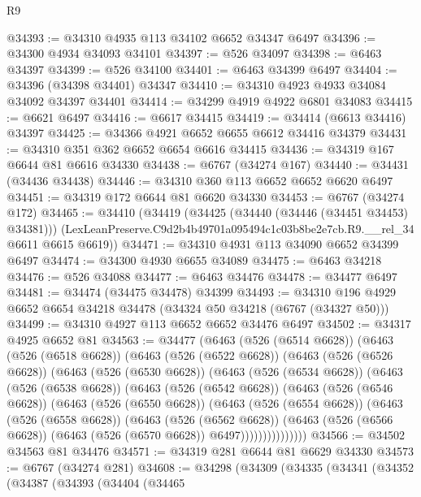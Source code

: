 \begin{lexlean}{R9}
\begin{coremodule}
@34393 := @34310 @4935 @113 @34102 @6652 @34347 @6497
@34396 := @34300 @4934 @34093 @34101
@34397 := @526 @34097
@34398 := @6463 @34397
@34399 := @526 @34100
@34401 := @6463 @34399 @6497
@34404 := @34396 (@34398 @34401) @34347
@34410 := @34310 @4923 @4933 @34084 @34092 @34397 @34401
@34414 := @34299 @4919 @4922 @6801 @34083
@34415 := @6621 @6497
@34416 := @6617 @34415
@34419 := @34414 (@6613 @34416) @34397
@34425 := @34366 @4921 @6652 @6655 @6612 @34416 @34379
@34431 := @34310 @351 @362 @6652 @6654 @6616 @34415
@34436 := @34319 @167 @6644 @81 @6616 @34330
@34438 := @6767 (@34274 @167)
@34440 := @34431 (@34436 @34438)
@34446 := @34310 @360 @113 @6652 @6652 @6620 @6497
@34451 := @34319 @172 @6644 @81 @6620 @34330
@34453 := @6767 (@34274 @172)
@34465 := @34410
    (@34419
      (@34425 (@34440 (@34446 (@34451 @34453) @34381)))
      (LexLeanPreserve.C9d2b4b49701a095494c1c03b8be2e7cb.R9.__rel_34 @6611 @6615 @6619))
@34471 := @34310 @4931 @113 @34090 @6652 @34399 @6497
@34474 := @34300 @4930 @6655 @34089
@34475 := @6463 @34218
@34476 := @526 @34088
@34477 := @6463 @34476
@34478 := @34477 @6497
@34481 := @34474 (@34475 @34478) @34399
@34493 := @34310 @196 @4929 @6652 @6654 @34218 @34478 (@34324 @50 @34218 (@6767 (@34327 @50)))
@34499 := @34310 @4927 @113 @6652 @6652 @34476 @6497
@34502 := @34317 @4925 @6652 @81
@34563 := @34477
    (@6463
      (@526 (@6514 @6628))
      (@6463
        (@526 (@6518 @6628))
        (@6463
          (@526 (@6522 @6628))
          (@6463
            (@526 (@6526 @6628))
            (@6463
              (@526 (@6530 @6628))
              (@6463
                (@526 (@6534 @6628))
                (@6463
                  (@526 (@6538 @6628))
                  (@6463
                    (@526 (@6542 @6628))
                    (@6463
                      (@526 (@6546 @6628))
                      (@6463
                        (@526 (@6550 @6628))
                        (@6463
                          (@526 (@6554 @6628))
                          (@6463
                            (@526 (@6558 @6628))
                            (@6463
                              (@526 (@6562 @6628))
                              (@6463
                                (@526 (@6566 @6628))
                                (@6463 (@526 (@6570 @6628)) @6497)))))))))))))))
@34566 := @34502 @34563 @81 @34476
@34571 := @34319 @281 @6644 @81 @6629 @34330
@34573 := @6767 (@34274 @281)
@34608 := @34298
    (@34309
      (@34335
        (@34341
          (@34352
            (@34387
              (@34393
                (@34404
                  (@34465

\end{coremodule}
\end{lexlean}
